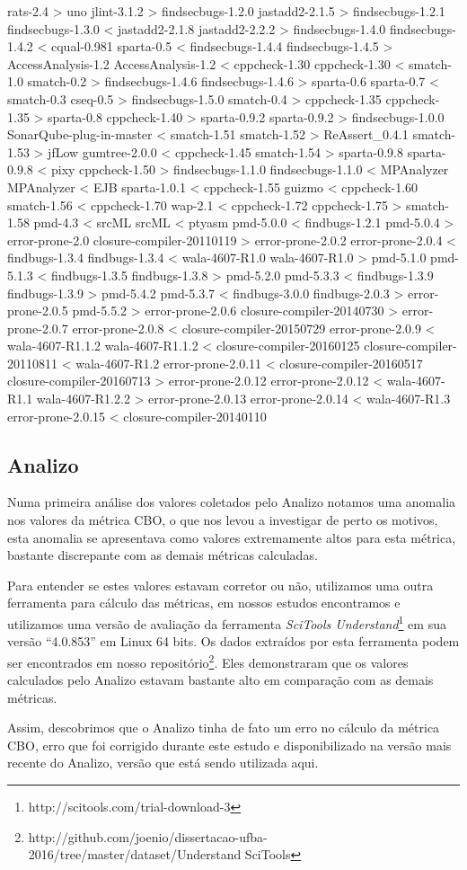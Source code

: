 rats-2.4 > uno
jlint-3.1.2 > findsecbugs-1.2.0
jastadd2-2.1.5 > findsecbugs-1.2.1
findsecbugs-1.3.0 < jastadd2-2.1.8
jastadd2-2.2.2 > findsecbugs-1.4.0
findsecbugs-1.4.2 < cqual-0.981
sparta-0.5 < findsecbugs-1.4.4
findsecbugs-1.4.5 > AccessAnalysis-1.2
AccessAnalysis-1.2 < cppcheck-1.30
cppcheck-1.30 < smatch-1.0
smatch-0.2 > findsecbugs-1.4.6
findsecbugs-1.4.6 > sparta-0.6
sparta-0.7 < smatch-0.3
cseq-0.5 > findsecbugs-1.5.0
smatch-0.4 > cppcheck-1.35
cppcheck-1.35 > sparta-0.8
cppcheck-1.40 > sparta-0.9.2
sparta-0.9.2 > findsecbugs-1.0.0
SonarQube-plug-in-master < smatch-1.51
smatch-1.52 > ReAssert\_0.4.1
smatch-1.53 > jfLow
gumtree-2.0.0 < cppcheck-1.45
smatch-1.54 > sparta-0.9.8
sparta-0.9.8 < pixy
cppcheck-1.50 > findsecbugs-1.1.0
findsecbugs-1.1.0 < MPAnalyzer
MPAnalyzer < EJB
sparta-1.0.1 < cppcheck-1.55
guizmo < cppcheck-1.60
smatch-1.56 < cppcheck-1.70
wap-2.1 < cppcheck-1.72
cppcheck-1.75 > smatch-1.58
pmd-4.3 < srcML
srcML < ptyasm
pmd-5.0.0 < findbugs-1.2.1
pmd-5.0.4 > error-prone-2.0
closure-compiler-20110119 > error-prone-2.0.2
error-prone-2.0.4 < findbugs-1.3.4
findbugs-1.3.4 < wala-4607-R1.0
wala-4607-R1.0 > pmd-5.1.0
pmd-5.1.3 < findbugs-1.3.5
findbugs-1.3.8 > pmd-5.2.0
pmd-5.3.3 < findbugs-1.3.9
findbugs-1.3.9 > pmd-5.4.2
pmd-5.3.7 < findbugs-3.0.0
findbugs-2.0.3 > error-prone-2.0.5
pmd-5.5.2 > error-prone-2.0.6
closure-compiler-20140730 > error-prone-2.0.7
error-prone-2.0.8 < closure-compiler-20150729
error-prone-2.0.9 < wala-4607-R1.1.2
wala-4607-R1.1.2 < closure-compiler-20160125
closure-compiler-20110811 < wala-4607-R1.2
error-prone-2.0.11 < closure-compiler-20160517
closure-compiler-20160713 > error-prone-2.0.12
error-prone-2.0.12 < wala-4607-R1.1
wala-4607-R1.2.2 > error-prone-2.0.13
error-prone-2.0.14 < wala-4607-R1.3
error-prone-2.0.15 < closure-compiler-20140110








\subsection{Analizo}

Numa primeira análise dos valores coletados pelo Analizo notamos uma anomalia
nos valores da métrica CBO, o que nos levou a investigar de perto os motivos,
esta anomalia se apresentava como valores extremamente altos para esta métrica,
bastante discrepante com as demais métricas calculadas.

Para entender se estes valores estavam corretor ou não, utilizamos uma outra
ferramenta para cálculo das métricas, em nossos estudos encontramos e
utilizamos uma versão de avaliação da ferramenta {\it SciTools
Understand}\footnote{http://scitools.com/trial-download-3} em sua versão
``4.0.853'' em Linux 64 bits. Os dados extraídos por esta ferramenta podem ser
encontrados em nosso
repositório\footnote{http://github.com/joenio/dissertacao-ufba-2016/tree/master/dataset/Understand
SciTools}. Eles demonstraram que os valores calculados pelo Analizo estavam
bastante alto em comparação com as demais métricas.

Assim, descobrimos que o Analizo tinha de fato um erro no cálculo da métrica
CBO, erro que foi corrigido durante este estudo e disponibilizado na versão
mais recente do Analizo, versão que está sendo utilizada aqui.
